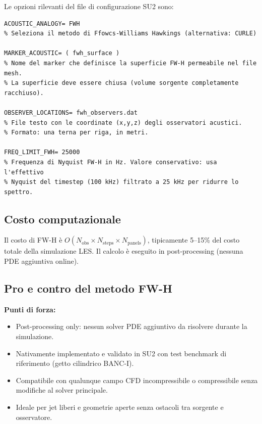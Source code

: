 \documentclass[11pt,a4paper]{article}
\begin{document}
Le opzioni rilevanti del file di configurazione SU2 sono:

\begin{lstlisting}[style=SU2cfg, caption={Opzioni SU2 per l'analisi acustica FW-H.}, label=lst:fwh_cfg]
% --- Analogia acustica FW-H ---
ACOUSTIC_ANALOGY= FWH
% Seleziona il metodo di Ffowcs-Williams Hawkings (alternativa: CURLE)

MARKER_ACOUSTIC= ( fwh_surface )
% Nome del marker che definisce la superficie FW-H permeabile nel file mesh.
% La superficie deve essere chiusa (volume sorgente completamente racchiuso).

OBSERVER_LOCATIONS= fwh_observers.dat
% File testo con le coordinate (x,y,z) degli osservatori acustici.
% Formato: una terna per riga, in metri.

FREQ_LIMIT_FWH= 25000
% Frequenza di Nyquist FW-H in Hz. Valore conservativo: usa l'effettivo
% Nyquist del timestep (100 kHz) filtrato a 25 kHz per ridurre lo spettro.
\end{lstlisting}

\subsection{Costo computazionale}

Il costo di FW-H è $O(N_\mathrm{obs} \times N_\mathrm{steps} \times N_\mathrm{panels})$,
tipicamente 5–15\% del costo totale della simulazione LES.
Il calcolo è eseguito in post-processing (nessuna PDE aggiuntiva online).

\subsection{Pro e contro del metodo FW-H}

\textbf{Punti di forza:}
\begin{itemize}
  \item Post-processing only: nessun solver PDE aggiuntivo da risolvere durante
        la simulazione.
  \item Nativamente implementato e validato in SU2 con test benchmark di
        riferimento (getto cilindrico BANC-I).
  \item Compatibile con qualunque campo CFD incompressibile o compressibile
        senza modifiche al solver principale.
  \item Ideale per jet liberi e geometrie aperte senza ostacoli tra sorgente
        e osservatore.
\end{itemize}
\end{document}
